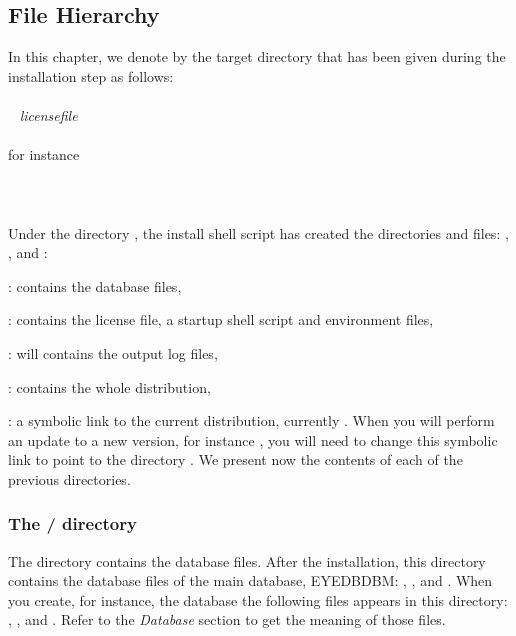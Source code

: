 \subsection{File Hierarchy}
In this chapter, we denote by {\tdir } the target directory that has been given
during the installation step as follows:\\
\\
\mbox{ } {\tdir } \emph{licensefile}\\
\\
for instance
\\
\\
\mbox{ }
\\
\\
Under the directory \tdir, the install shell script has created the
directories and files: , ,  and :
\bi
\item {}: contains the database files,
\item {}: contains the license file, a startup shell script
and environment files,
\item {}: will contains the output log files,
\item {}: contains the whole \eyedbversion \eyedb distribution,
\item {}: a symbolic link to the current distribution, currently
.
When you will perform an update to a new version, for instance \eyedbversion,
you will need to change this symbolic link to point to
the directory .
\ei
We present now the contents of each of the previous directories.
\subsubsection{The \tdir/ directory}
The  directory contains the database files. After the installation,
this directory contains the database files of the main \eyedb database,
\textsc{EYEDBDBM}: , ,  and
. When you create, for instance, the database 
the following files
appears in this directory: , ,
 and . Refer to the \emph{Database} section
to get the meaning of those files.

